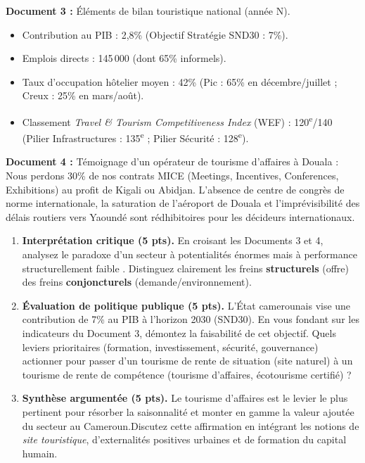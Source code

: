 \documentclass[11pt]{article}
\begin{document}
\begin{exercice}
\textbf{Document 3 :} Éléments de bilan touristique national (année N).
\begin{itemize}
    \item Contribution au PIB : 2,8\% (Objectif Stratégie SND30 : 7\%).
    \item Emplois directs : 145\,000 (dont 65\% informels).
    \item Taux d'occupation hôtelier moyen : 42\% (Pic : 65\% en décembre/juillet ; Creux : 25\% en mars/août).
    \item Classement \textit{Travel \& Tourism Competitiveness Index} (WEF) : 120\textsuperscript{e}/140 (Pilier \og Infrastructures \fg : 135\textsuperscript{e} ; Pilier \og Sécurité \fg : 128\textsuperscript{e}).
\end{itemize}

\textbf{Document 4 :} Témoignage d'un opérateur de tourisme d'affaires à Douala : \og Nous perdons 30\% de nos contrats MICE (Meetings, Incentives, Conferences, Exhibitions) au profit de Kigali ou Abidjan. L'absence de centre de congrès de norme internationale, la saturation de l'aéroport de Douala et l'imprévisibilité des délais routiers vers Yaoundé sont rédhibitoires pour les décideurs internationaux.\fg

\begin{enumerate}
    \item \textbf{Interprétation critique (5 pts).} En croisant les Documents 3 et 4, analysez le paradoxe d'un secteur à \og potentialités énormes \fg mais à \og performance structurellement faible \fg. Distinguez clairement les freins \textbf{structurels} (offre) des freins \textbf{conjoncturels} (demande/environnement).
    \item \textbf{Évaluation de politique publique (5 pts).} L'État camerounais vise une contribution de 7\% au PIB à l'horizon 2030 (SND30). En vous fondant sur les indicateurs du Document 3, démontez la faisabilité de cet objectif. Quels leviers prioritaires (formation, investissement, sécurité, gouvernance) actionner pour passer d'un tourisme de \og rente de situation \fg (site naturel) à un tourisme de \og rente de compétence \fg (tourisme d'affaires, écotourisme certifié) ?
    \item \textbf{Synthèse argumentée (5 pts).} \og Le tourisme d'affaires est le levier le plus pertinent pour résorber la saisonnalité et monter en gamme la valeur ajoutée du secteur au Cameroun.\fg Discutez cette affirmation en intégrant les notions de \textit{site touristique}, d'externalités positives urbaines et de formation du capital humain.
\end{enumerate}
\end{exercice}
\end{document}
